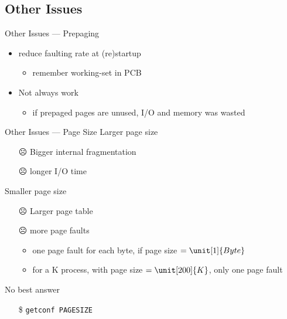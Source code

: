 \subsection{Other Issues}

\begin{frame}{Other Issues --- Prepaging}
  \begin{center}
  \end{center}
  \begin{itemize}
  \item reduce faulting rate at (re)startup
    \begin{itemize}
    \item remember working-set in PCB
    \end{itemize}
  \item Not always work
    \begin{itemize}
    \item if prepaged pages are unused, I/O and memory was wasted
    \end{itemize}
  \end{itemize}
\end{frame}

\begin{frame}{Other Issues --- Page Size}%
  Larger page size
  \begin{itemize}
  \item[\alert{☹}] Bigger internal fragmentation
  \item[\alert{☹}] longer I/O time
  \end{itemize}
  Smaller page size
  \begin{itemize}
  \item[\alert{☹}] Larger page table
  \item[\alert{☹}] more page faults
    \begin{itemize}
    \item one page fault for each byte, if page size \(= \unit[1]{Byte}\)
    \item for a \unit[200]{K} process, with page size \(= \unit[200]{K}\), only one page fault
    \end{itemize}
  \end{itemize}
  No best answer
  \begin{itemize}
    \item[\$] \texttt{getconf PAGESIZE}
  \end{itemize}
\end{frame}

